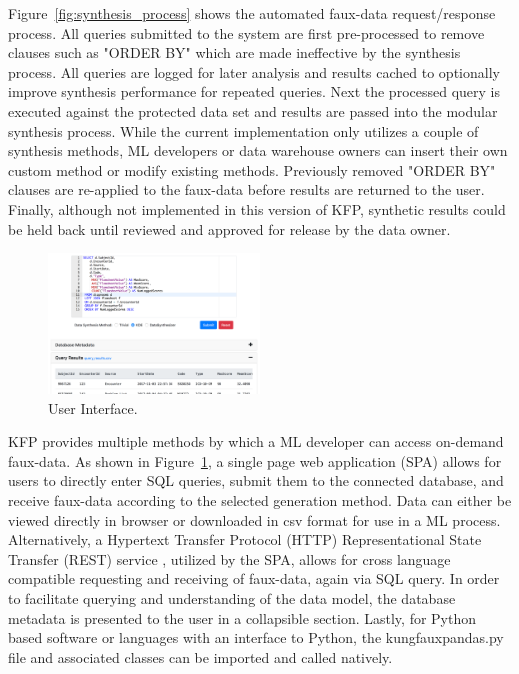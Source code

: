 \documentclass{article}
\begin{document}
Figure~\ref{fig:synthesis_process} shows the automated faux-data request/response process. All queries submitted to the system are first pre-processed to remove clauses such as "ORDER BY" which are made ineffective by the synthesis process. All queries are logged for later analysis and results cached to optionally improve synthesis performance for repeated queries. Next the processed query is executed against the protected data set and results are passed into the modular synthesis process. While the current implementation only utilizes a couple of synthesis methods, ML developers or data warehouse owners can insert their own custom method or modify existing methods. Previously removed "ORDER BY" clauses are re-applied to the faux-data before results are returned to the user. Finally, although not implemented in this version of KFP, synthetic results could be held back until reviewed and approved for release by the data owner.

\begin{figure}%
  \centering
  \includegraphics[width=0.5\textwidth]{ui_screenshot3}
  \caption{User Interface.}
  \label{fig:ui}
\end{figure}

KFP provides multiple methods by which a ML developer can access on-demand faux-data. As shown in Figure~\ref{fig:ui}, a single page web application (SPA) allows for users to directly enter SQL queries, submit them to the connected database, and receive faux-data according to the selected generation method. Data can either be viewed directly in browser or downloaded in csv format for use in a ML process. Alternatively, a Hypertext Transfer Protocol (HTTP) Representational State Transfer (REST) service \cite{w3c_working_group_webservices}, utilized by the SPA, allows for cross language compatible requesting and receiving of faux-data, again via SQL query. In order to facilitate querying and understanding of the data model, the database metadata is presented to the user in a collapsible section. Lastly, for Python based software or languages with an interface to Python, the kungfauxpandas.py file and associated classes can be imported and called natively.
\end{document}

